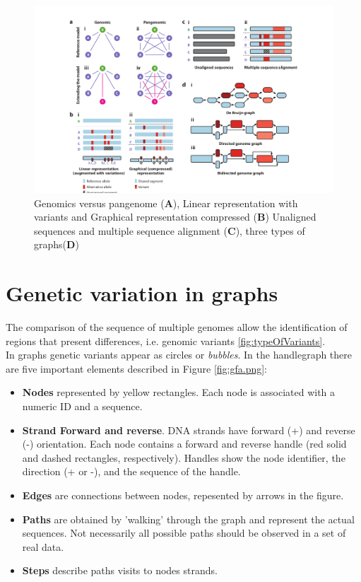\begin{figure}[H]
\centering
\includegraphics[width=1.00\textwidth]{fig/pangenome_genome.png}
\decoRule
\caption{Genomics versus pangenome (\textbf{A}), Linear representation with variants and Graphical representation compressed (\textbf{B})  Unaligned sequences and multiple sequence alignment (\textbf{C}), three types of graphs(\textbf{D}) \cite{eizenga2020pangenome}}
\label{fig:genomevspangenome.png}
\end{figure}


\section{Genetic variation in graphs}
The comparison of the sequence of multiple  genomes allow the identification of regions that present differences, i.e. genomic variants \ref{fig:typeOfVariants}.  \\ 




In graphs genetic variants appear as circles or \textit{bubbles}. In the handlegraph there are five important elements described in Figure \ref{fig:gfa.png}:
\begin{itemize}
\item\textbf{Nodes} represented by yellow rectangles. Each node is associated with a numeric ID and a sequence. 

\item\textbf{Strand Forward and reverse}. DNA strands have forward (+) and reverse (-) orientation. Each node contains a forward and reverse handle (red solid and dashed rectangles, respectively). Handles show the node identifier, the direction (+ or -), and the sequence of the handle.

\item\textbf{Edges} are connections between nodes, repesented by arrows in the figure.

\item\textbf{Paths} are obtained by 'walking' through the graph and represent the actual sequences. Not necessarily all possible paths should be observed in a set of real data.

\item\textbf{Steps} describe paths visits to nodes strands.
\end{itemize}

